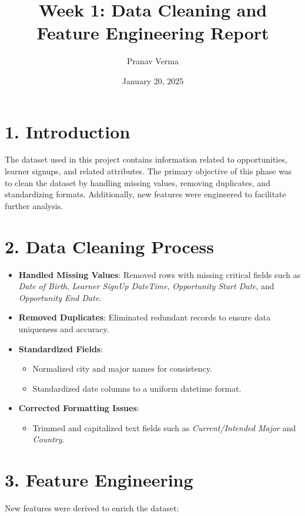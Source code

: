 \documentclass[12pt,a4paper]{article}
\title{Week 1: Data Cleaning and Feature Engineering Report}
\author{Pranav Verma}
\date{January 20, 2025}
\begin{document}
\maketitle

\section*{1. Introduction}
The dataset used in this project contains information related to opportunities, learner signups, and related attributes. The primary objective of this phase was to clean the dataset by handling missing values, removing duplicates, and standardizing formats. Additionally, new features were engineered to facilitate further analysis.

\section*{2. Data Cleaning Process}

\begin{itemize}
\item \textbf{Handled Missing Values}: Removed rows with missing critical fields such as \textit{Date of Birth}, \textit{Learner SignUp DateTime}, \textit{Opportunity Start Date}, and \textit{Opportunity End Date}.
\item \textbf{Removed Duplicates}: Eliminated redundant records to ensure data uniqueness and accuracy.
\item \textbf{Standardized Fields}:
\begin{itemize}
\item Normalized city and major names for consistency.
\item Standardized date columns to a uniform datetime format.
\end{itemize}
\item \textbf{Corrected Formatting Issues}:
\begin{itemize}
\item Trimmed and capitalized text fields such as \textit{Current/Intended Major} and \textit{Country}.
\end{itemize}
\end{itemize}

\section*{3. Feature Engineering}

New features were derived to enrich the dataset:
\end{document}
